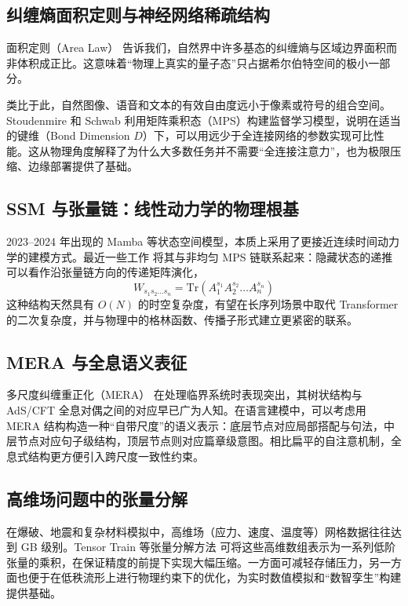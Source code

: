 \documentclass[12pt,a4paper]{article}
\begin{document}
\subsection{纠缠熵面积定则与神经网络稀疏结构}

面积定则（Area Law）\cite{eisert2010colloquium} 告诉我们，自然界中许多基态的纠缠熵与区域边界面积而非体积成正比。这意味着“物理上真实的量子态”只占据希尔伯特空间的极小一部分。

类比于此，自然图像、语音和文本的有效自由度远小于像素或符号的组合空间。Stoudenmire 和 Schwab\cite{stoudenmire2016supervised} 利用矩阵乘积态（MPS）构建监督学习模型，说明在适当的键维（Bond Dimension $D$）下，可以用远少于全连接网络的参数实现可比性能。这从物理角度解释了为什么大多数任务并不需要“全连接注意力”，也为极限压缩、边缘部署提供了基础。

\subsection{SSM 与张量链：线性动力学的物理根基}

2023–2024 年出现的 Mamba 等状态空间模型\cite{gu2023mamba}，本质上采用了更接近连续时间动力学的建模方式。最近一些工作\cite{ali2024tensor} 将其与非均匀 MPS 链联系起来：隐藏状态的递推可以看作沿张量链方向的传递矩阵演化，
\begin{equation}
    W_{s_1 s_2 \dots s_n} = \text{Tr}(A_1^{s_1} A_2^{s_2} \dots A_n^{s_n})
\end{equation}
这种结构天然具有 $O(N)$ 的时空复杂度，有望在长序列场景中取代 Transformer 的二次复杂度，并与物理中的格林函数、传播子形式建立更紧密的联系。

\subsection{MERA 与全息语义表征}

多尺度纠缠重正化（MERA）\cite{vidal2008class} 在处理临界系统时表现突出，其树状结构与 AdS/CFT 全息对偶之间的对应早已广为人知。在语言建模中，可以考虑用 MERA 结构构造一种“自带尺度”的语义表示：底层节点对应局部搭配与句法，中层节点对应句子级结构，顶层节点则对应篇章级意图。相比扁平的自注意机制，全息式结构更方便引入跨尺度一致性约束。

\subsection{高维场问题中的张量分解}

在爆破、地震和复杂材料模拟中，高维场（应力、速度、温度等）网格数据往往达到 GB 级别。Tensor Train 等张量分解方法\cite{novikov2015tensor} 可将这些高维数组表示为一系列低阶张量的乘积，在保证精度的前提下实现大幅压缩。一方面可减轻存储压力，另一方面也便于在低秩流形上进行物理约束下的优化，为实时数值模拟和“数智孪生”构建提供基础。
\end{document}
